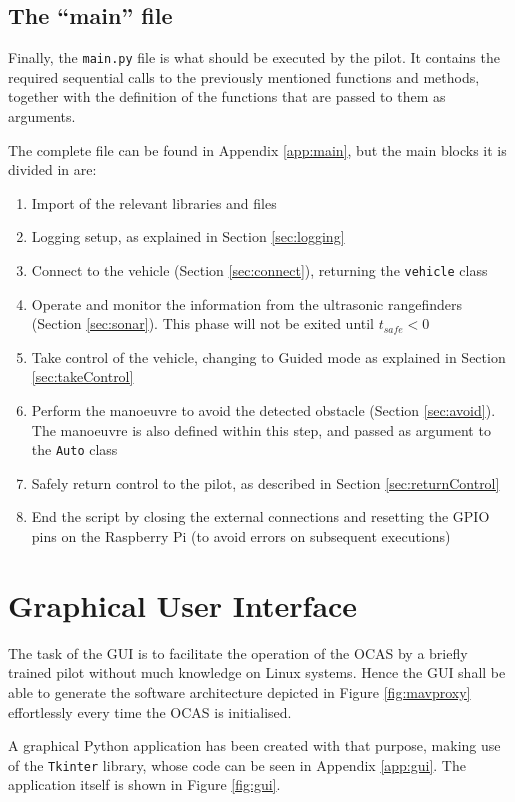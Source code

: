 \subsection{The ``main'' file}

Finally, the \texttt{main.py} file is what should be executed by the pilot.
It contains the required sequential calls to the previously mentioned functions and methods, together with the definition of the functions that are passed to them as arguments.

The complete file can be found in Appendix \ref{app:main}, but the main blocks it is divided in are:

\begin{enumerate}
	\item Import of the relevant libraries and files
	\item Logging setup, as explained in Section \ref{sec:logging}
	\item Connect to the vehicle (Section \ref{sec:connect}), returning the \texttt{vehicle} class
	\item Operate and monitor the information from the ultrasonic rangefinders (Section \ref{sec:sonar}). This phase will not be exited until $t_{safe}<0$
	\item Take control of the vehicle, changing to Guided mode as explained in Section \ref{sec:takeControl}
	\item Perform the manoeuvre to avoid the detected obstacle (Section \ref{sec:avoid}). The manoeuvre is also defined within this step, and passed as argument to the \texttt{Auto} class
	\item Safely return control to the pilot, as described in Section \ref{sec:returnControl}
	\item End the script by closing the external connections and resetting the GPIO pins on the Raspberry Pi (to avoid errors on subsequent executions)
\end{enumerate}


\section{Graphical User Interface}

The task of the GUI is to facilitate the operation of the OCAS by a briefly trained pilot without much knowledge on Linux systems.
Hence the GUI shall be able to generate the software architecture depicted in Figure \ref{fig:mavproxy} effortlessly every time the OCAS is initialised.

A graphical Python application has been created with that purpose, making use of the \texttt{Tkinter} library, whose code can be seen in Appendix \ref{app:gui}.
The application itself is shown in Figure \ref{fig:gui}.

